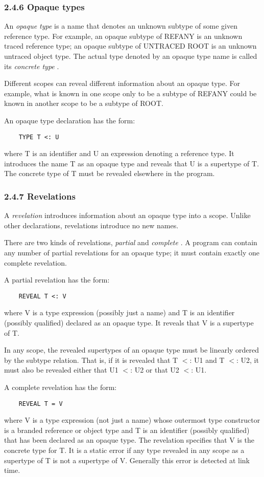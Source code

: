 \documentclass[10pt]{article}
\begin{document}
\subsubsection*{2.4.6 Opaque types}

An \emph{opaque type} is a name that denotes an unknown subtype of some given
reference type. For example, an opaque subtype of REFANY is an unknown traced
reference type; an opaque subtype of UNTRACED ROOT is an unknown untraced
object type. The actual type denoted by an opaque type name is called its
\emph{concrete type} .

Different scopes can reveal different information about an opaque type. For
example, what is known in one scope only to be a subtype of REFANY could be
known in another scope to be a subtype of ROOT.

An opaque type declaration has the form:
\begin{verbatim}
    TYPE T <: U
\end{verbatim}
where T is an identifier and U an expression denoting a reference type. It
introduces the name T as an opaque type and reveals that U is a supertype of
T. The concrete type of T must be revealed elsewhere in the program.

\subsubsection*{2.4.7 Revelations}

A \emph{revelation} introduces information about an opaque type into a
scope. Unlike other declarations, revelations introduce no new names.

There are two kinds of revelations, \emph{partial} and \emph{complete} . A
program can contain any number of partial revelations for an opaque type; it
must contain exactly one complete revelation.

A partial revelation has the form:
\begin{verbatim}
    REVEAL T <: V
\end{verbatim}
where V is a type expression (possibly just a name) and T is an identifier
(possibly qualified) declared as an opaque type. It reveals that V is a
supertype of T.

In any scope, the revealed supertypes of an opaque type must be linearly
ordered by the subtype relation. That is, if it is revealed that T $<$: U1 and
T $<$: U2, it must also be revealed either that U1 $<$: U2 or that U2 $<$: U1.

A complete revelation has the form:
\begin{verbatim}
    REVEAL T = V
\end{verbatim}
where V is a type expression (not just a name) whose outermost type
constructor is a branded reference or object type and T is an identifier
(possibly qualified) that has been declared as an opaque type. The revelation
specifies that V is the concrete type for T. It is a static error if any type
revealed in any scope as a supertype of T is not a supertype of V. Generally
this error is detected at link time.
\end{document}

